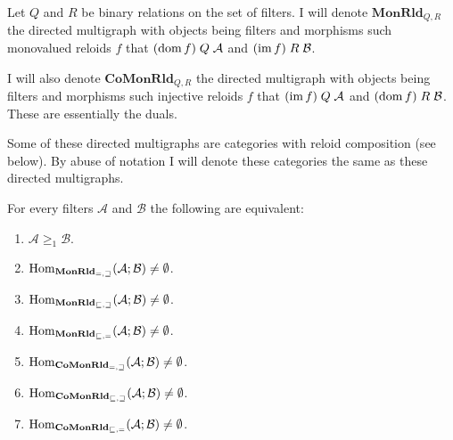 \begin{defn}
Let $Q$ and $R$ be binary relations on the set of filters. I will
denote $\mathbf{MonRld}_{Q,R}$ the directed multigraph with objects
being filters and morphisms such monovalued reloids $f$ that $(\operatorname{dom} f)\mathrel Q\mathcal{A}$
and $(\operatorname{im} f)\mathrel R\mathcal{B}$.

I will also denote $\mathbf{CoMonRld}_{Q,R}$ the directed multigraph
with objects being filters and morphisms such injective reloids $f$
that $(\operatorname{im} f)\mathrel Q\mathcal{A}$ and $(\operatorname{dom} f)\mathrel R\mathcal{B}$.
These are essentially the duals.
\end{defn}
Some of these directed multigraphs are categories with reloid composition
(see below). By abuse of notation I will denote these categories the
same as these directed multigraphs.
\begin{thm}
For every filters $\mathcal{A}$ and $\mathcal{B}$ the following
are equivalent:
\begin{enumerate}
\item \label{ge1-ineq}$\mathcal{A}\ge_{1}\mathcal{B}$.
\item \label{ge1-eq-ge}$\operatorname{Hom}_{\mathbf{MonRld}_{=,\sqsupseteq}}(\mathcal{A};\mathcal{B})\ne\emptyset$.
\item \label{ge1-le-ge}$\operatorname{Hom}_{\mathbf{MonRld}_{\sqsubseteq,\sqsupseteq}}(\mathcal{A};\mathcal{B})\ne\emptyset$.
\item \label{ge1-le-eq}$\operatorname{Hom}_{\mathbf{MonRld}_{\sqsubseteq,=}}(\mathcal{A};\mathcal{B})\ne\emptyset$.
\item \label{g1-c-eq-ge}$\operatorname{Hom}_{\mathbf{CoMonRld}_{=,\sqsupseteq}}(\mathcal{A};\mathcal{B})\ne\emptyset$.
\item \label{g1-c-le-ge}$\operatorname{Hom}_{\mathbf{CoMonRld}_{\sqsubseteq,\sqsupseteq}}(\mathcal{A};\mathcal{B})\ne\emptyset$.
\item \label{g1-c-le-eq}$\operatorname{Hom}_{\mathbf{CoMonRld}_{\sqsubseteq,=}}(\mathcal{A};\mathcal{B})\ne\emptyset$.
\end{enumerate}
\end{thm}
